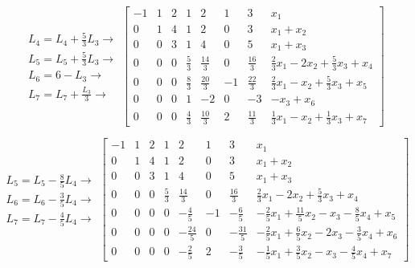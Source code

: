 \documentclass[11pt]{article}
\newenvironment{question}[1]
  {\par\addvspace{\medskipamount}
   \noindent\makebox[0pt][r]{\textbf{#1)} }\ignorespaces}
  {\par\addvspace{\medskipamount}}
\begin{document}
\begin{question}{4}
$$
\substack{
  \mbox{$L_4=L_4+\frac{5}{3}L_3 \rightarrow$}\\[.5em]
  \mbox{$L_5=L_5+\frac{5}{3}L_3 \rightarrow$}\\[.5em]
  \mbox{$L_6=6-L_3 \rightarrow$}\\[.5em]
  \mbox{$L_7=L_7+\frac{L_3}{3} \rightarrow$}
}
\left[\begin{array}{rrrrrrr|l}
    -1 & 1 & 2 & 1 & 2 & 1 & 3 & x_1\\
    0 & 1 & 4 & 1 & 2 & 0 & 3 & x_1 + x_2\\
    0 & 0 & 3 & 1 & 4 & 0 & 5 & x_1 + x_3\\
    0 & 0 & 0 & \frac{5}{3} & \frac{14}{3} & 0 & \frac{16}{3} & \frac{2}{3}x_1 - 2 x_2 + \frac{5}{3}x_3 + x_4\\
    0 & 0 & 0 & \frac{8}{3} & \frac{20}{3} & -1 & \frac{22}{3} & \frac{2}{3}x_1 - x_2 + \frac{5}{3}x_3 + x_5\\
    0 & 0 & 0 & 1 & -2 & 0 & -3 & - x_3 + x_6\\
    0 & 0 & 0 & \frac{4}{3} & \frac{10}{3} & 2 & \frac{11}{3} & \frac{1}{3}x_1 - x_2 + \frac{1}{3}x_3 + x_7
\end{array}\right]
$$

$$
\substack{
  \mbox{$L_5=L_5-\frac{8}{5}L_4 \rightarrow$}\\[.5em]
  \mbox{$L_6=L_6-\frac{3}{5}L_4 \rightarrow$}\\[.5em]
  \mbox{$L_7=L_7-\frac{4}{5}L_4 \rightarrow$}
}
\left[\begin{array}{rrrrrrr|l}
    -1 & 1 & 2 & 1 & 2 & 1 & 3 & x_1\\
    0 & 1 & 4 & 1 & 2 & 0 & 3 & x_1 + x_2\\
    0 & 0 & 3 & 1 & 4 & 0 & 5 & x_1 + x_3\\
    0 & 0 & 0 & \frac{5}{3} & \frac{14}{3} & 0 & \frac{16}{3} & \frac{2}{3}x_1 - 2 x_2 + \frac{5}{3}x_3 + x_4\\
    0 & 0 & 0 & 0 & - \frac{4}{5} & -1 & - \frac{6}{5} & - \frac{2}{5}x_1 + \frac{11}{5}x_2 - x_3 - \frac{8}{5}x_4 + x_5\\
    0 & 0 & 0 & 0 & - \frac{24}{5} & 0 & - \frac{31}{5} & - \frac{2}{5}x_1 + \frac{6}{5}x_2 - 2 x_3 - \frac{3}{5}x_4 + x_6\\
    0 & 0 & 0 & 0 & - \frac{2}{5} & 2 & - \frac{3}{5} & - \frac{1}{5}x_1 + \frac{3}{5}x_2 - x_3 - \frac{4}{5}x_4 + x_7
\end{array}\right]
$$



\end{question}
\end{document}
